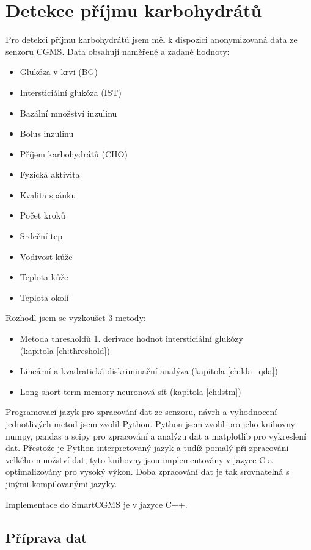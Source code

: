 \chapter{Detekce příjmu karbohydrátů}

Pro detekci příjmu karbohydrátů jsem měl k dispozici anonymizovaná data ze senzoru CGMS. Data obsahují naměřené a zadané hodnoty:
\begin{itemize}
\setlength\itemsep{0em}
\item Glukóza v krvi (BG)
\item Intersticiální glukóza (IST)
\item Bazální množství inzulinu
\item Bolus inzulinu
\item Příjem karbohydrátů (CHO)
\item Fyzická aktivita
\item Kvalita spánku
\item Počet kroků
\item Srdeční tep
\item Vodivost kůže
\item Teplota kůže
\item Teplota okolí
\end{itemize}

Rozhodl jsem se vyzkoušet 3 metody:
\begin{itemize}
\setlength\itemsep{0em}
\item Metoda thresholdů 1. derivace hodnot intersticiální glukózy \\(kapitola \ref{ch:threshold})
\item Lineární a kvadratická diskriminační analýza (kapitola \ref{ch:lda_qda})
\item Long short-term memory neuronová síť (kapitola \ref{ch:lstm})
\end{itemize}

Programovací jazyk pro zpracování dat ze senzoru, návrh a vyhodnocení jednotlivých metod jsem zvolil Python. Python jsem zvolil pro jeho knihovny numpy, pandas a scipy pro zpracování a analýzu dat a matplotlib pro vykreslení dat. Přestože je Python interpretovaný jazyk a tudíž pomalý při zpracování velkého množství dat, tyto knihovny jsou implementovány v jazyce C a optimalizovány pro vysoký výkon. Doba zpracování dat je tak srovnatelná s jinými kompilovanými jazyky.

Implementace do SmartCGMS je v jazyce C++.

\newpage

\section{Příprava dat}

